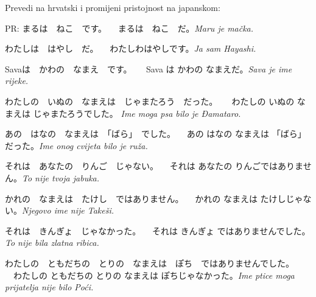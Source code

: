 
\author{Katja Kržišnik}

	
	\begin{mondai}{\ten Prevedi na hrvatski i promijeni pristojnost na japanskom:}
		\item PR: まるは　ねこ　です。 \newline 　まるは　ねこ　だ。\hspace{20pt}\textit{Maru je mačka.}
		\item \vspace{3pt} わたしは　はやし　だ。 \newline 　わたしわはやしです。\hspace{20pt}\textit{Ja sam Hayashi.}
		\item Savaは　かわの　なまえ　です。 \newline 　 Sava は かわの なまえだ。\hspace{20pt}\textit{Sava je ime rijeke.}
		\item わたしの　いぬの　なまえは　じゃまたろう　だった。 \newline 　 わたしの いぬの なまえは じゃまたろうでした。\hspace{20pt} \textit{Ime moga psa bilo je Đamataro.}
		\item あの　はなの　なまえは　「ばら」　でした。 \newline  　あの はなの なまえは 「ばら」 だった。\hspace{20pt}\textit{Ime onog cvijeta bilo je ruža.}
		\item それは　あなたの　りんご　じゃない。 \newline  　それは あなたの りんごではありません。\hspace{20pt}\textit{To nije tvoja jabuka. }
		\item かれの　なまえは　たけし　ではありません。 \newline 　かれの なまえは たけしじゃない。\hspace{20pt}\textit{Njegovo ime nije Takeši. }
		\item それは　きんぎょ　じゃなかった。 \newline  　それは きんぎょ ではありませんでした。\hspace{20pt}\textit{To nije bila zlatna ribica.}
		\item わたしの　ともだちの　とりの　なまえは　ぽち　ではありませんでした。 \newline 　わたしの ともだちの とりの なまえは ぽちじゃなかった。\hspace{20pt}\textit{Ime ptice moga prijatelja nije bilo Poći.}
	\end{mondai}
	
